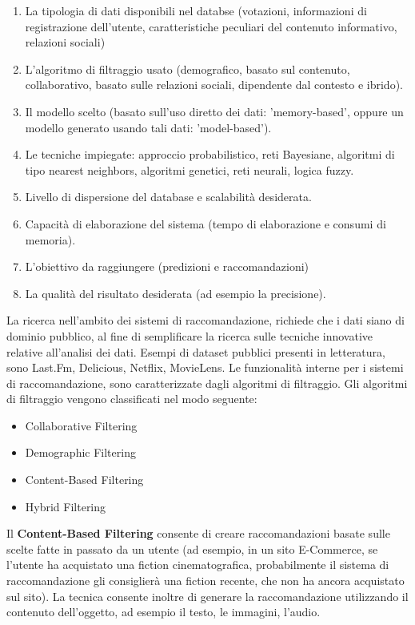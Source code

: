 \documentclass[12pt]{article}
\begin{document}
\begin{enumerate}
\item La tipologia di dati disponibili nel databse (votazioni, informazioni di registrazione dell'utente, caratteristiche peculiari del contenuto informativo, relazioni sociali)
\item L'algoritmo di filtraggio usato (demografico, basato sul contenuto, collaborativo, basato sulle relazioni sociali, dipendente dal contesto e ibrido).
\item Il modello scelto (basato sull'uso diretto dei dati: 'memory-based', oppure un modello generato usando tali dati: 'model-based').
\item Le tecniche impiegate: approccio probabilistico, reti Bayesiane, algoritmi di tipo nearest neighbors, algoritmi genetici, reti neurali, logica fuzzy.
\item Livello di dispersione del database e scalabilità desiderata.
\item Capacità di elaborazione del sistema (tempo di elaborazione e consumi di memoria).
\item L'obiettivo da raggiungere (predizioni e raccomandazioni)
\item La qualità del risultato desiderata (ad esempio la precisione).
\end{enumerate}

La ricerca nell'ambito dei sistemi di raccomandazione, richiede che i dati siano di dominio pubblico, al fine di semplificare la ricerca sulle tecniche innovative relative all'analisi dei dati. Esempi di dataset pubblici presenti in letteratura, sono Last.Fm, Delicious, Netflix, MovieLens.
Le funzionalità interne per i sistemi di raccomandazione, sono caratterizzate dagli algoritmi di filtraggio. 
Gli algoritmi di filtraggio vengono classificati nel modo seguente:
\begin{itemize}
	\item Collaborative Filtering
	\item Demographic Filtering
	\item Content-Based Filtering
	\item Hybrid Filtering
\end{itemize}

Il \textbf{Content-Based Filtering} consente di creare raccomandazioni basate sulle scelte fatte in passato da un utente (ad esempio, in un sito E-Commerce, se l'utente ha acquistato una fiction cinematografica, probabilmente il sistema di raccomandazione gli consiglierà una fiction recente, che non ha ancora acquistato sul sito). La tecnica consente inoltre di generare la raccomandazione utilizzando il contenuto dell'oggetto, ad esempio il testo, le immagini, l'audio.
\end{document}

